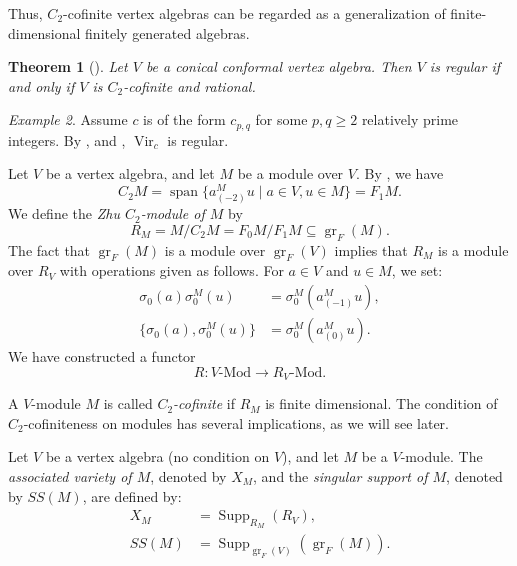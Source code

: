 \documentclass[a4paper, 12pt, reqno]{amsart}
\newtheorem{theorem}{Theorem}[section]
\theoremstyle{remark}
\newtheorem{example}[theorem]{Example}
\DeclareMathOperator{\Vir}{Vir}
\DeclareMathOperator{\gr}{gr}
\DeclareMathOperator{\vspan}{span}
\DeclareMathOperator{\Supp}{Supp}
\begin{document}
Thus, $C_2$-cofinite vertex algebras can be regarded as a generalization of finite-dimensional finitely generated algebras.

\begin{theorem}[{\cite[Theorem 4.5]{abe_rationality_2003}}]
  \label{thr:54}
  Let $V$ be a conical conformal vertex algebra.
  Then $V$ is regular if and only if $V$ is $C_2$-cofinite and rational.
\end{theorem}

\begin{example}
  \label{exa:18}
  Assume $c$ is of the form $c_{p, q}$ for some $p, q \ge 2$ relatively prime integers.
  By ,  and , $\Vir_c$ is regular.
\end{example}

Let $V$ be a vertex algebra, and let $M$ be a module over $V$.
By , we have
\begin{equation*}
  C_2M = \vspan\{a^M_{(-2)}u \mid a \in V, u \in M\} = F_1M.
\end{equation*}
We define the \emph{Zhu $C_2$-module of $M$} by
\begin{equation*}
  R_M = M/C_2M = F_0M/F_1M \subseteq \gr_F(M).
\end{equation*}
The fact that $\gr_F(M)$ is a module over $\gr_F(V)$ implies that $R_M$ is a module over $R_V$ with operations given as follows.
For $a \in V$ and $u \in M$, we set:
\begin{align*}
  \sigma_0(a)\sigma^M_0(u) &= \sigma^M_0(a^M_{(-1)}u), \\
  \{\sigma_0(a), \sigma^M_0(u)\} &= \sigma^M_0(a^M_{(0)}u).
\end{align*}
We have constructed a functor
\begin{equation*}
  R: \text{$V$-Mod} \to \text{$R_V$-Mod}.
\end{equation*}

A $V$-module $M$ is called \emph{$C_2$-cofinite} if $R_M$ is finite dimensional.
The condition of $C_2$-cofiniteness on modules has several implications, as we will see later.

Let $V$ be a vertex algebra (no condition on $V$), and let $M$ be a $V$-module.
The \emph{associated variety of $M$}, denoted by $X_M$, and the \emph{singular support of $M$}, denoted by $SS(M)$, are defined by:
\begin{align*}
  X_M &= \Supp_{R_M}(R_V), \\
  SS(M) &= \Supp_{\gr_F(V)}(\gr_F(M)).
\end{align*}
\end{document}
